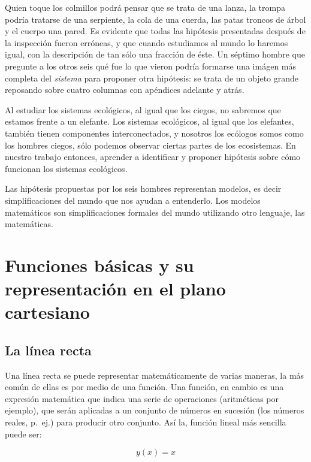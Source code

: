 \documentclass[
]{book}
\begin{document}
Quien toque los colmillos podrá pensar que se trata de una lanza, la trompa podría tratarse de una serpiente, la cola de una cuerda, las patas troncos de árbol y el cuerpo una pared. Es evidente que todas las hipótesis presentadas después de la inspección fueron erróneas, y que cuando estudiamos al mundo lo haremos igual, con la descripción de tan sólo una fracción de éste. Un séptimo hombre que pregunte a los otros seis qué fue lo que vieron podría formarse una imágen más completa del \emph{sistema} para proponer otra hipótesis: se trata de un objeto grande reposando sobre cuatro columnas con apéndices adelante y atrás.

Al estudiar los sistemas ecológicos, al igual que los ciegos, no sabremos que estamos frente a un elefante. Los sistemas ecológicos, al igual que los elefantes, también tienen componentes interconectados, y nosotros los ecólogos somos como los hombres ciegos, sólo podemos observar ciertas partes de los ecosistemas. En nuestro trabajo entonces, aprender a identificar y proponer hipótesis sobre cómo funcionan los sistemas ecológicos.

Las hipótesis propuestas por los seis hombres representan modelos, es decir simplificaciones del mundo que nos ayudan a entenderlo. Los modelos matemáticos son simplificaciones formales del mundo utilizando otro lenguaje, las matemáticas.

\hypertarget{funciones-buxe1sicas-y-su-representaciuxf3n-en-el-plano-cartesiano}{%
\section{Funciones básicas y su representación en el plano cartesiano}\label{funciones-buxe1sicas-y-su-representaciuxf3n-en-el-plano-cartesiano}}

\hypertarget{la-luxednea-recta}{%
\subsection{La línea recta}\label{la-luxednea-recta}}

Una línea recta se puede representar matemáticamente de varias maneras, la más común de ellas es por medio de una función. Una función, en cambio es una expresión matemática que indica una serie de operaciones (aritméticas por ejemplo), que serán aplicadas a un conjunto de números en sucesión (los números reales, p.~ej.) para producir otro conjunto. Así la, función lineal más sencilla puede ser:

\begin{equation}
    y(x) = x
\end{equation}
\end{document}
